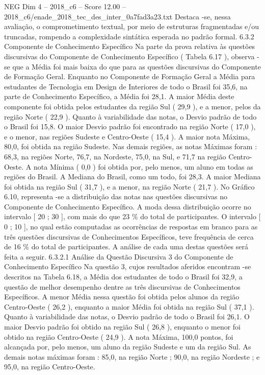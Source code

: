 \begin{textsample}{NEG Dim 4 – 2018\_c6 – Score 12.00 – 2018\_c6/enade\_2018\_tec\_des\_inter\_0a7fad3a23.txt}
Destaca -se, nessa avaliação, o comprometimento textual, por meio de estruturas fragmentadas e/ou truncadas, rompendo a complexidade sintática esperada no padrão formal. 6.3.2 Componente de Conhecimento Específico Na parte da prova relativa às questões discursivas do Componente de Conhecimento Específico ( Tabela 6.17 ), observa -se que a Média foi mais baixa do que para as questões discursivas do Componente de Formação Geral.
Enquanto no Componente de Formação Geral a Média para estudantes de Tecnologia em Design de Interiores de todo o Brasil foi 35,6, na parte de Conhecimento Específico, a Média foi 28,1.
A maior Média deste componente foi obtida pelos estudantes da região Sul ( 29,9 ), e a menor, pelos da região Norte ( 22,9 ).
Quanto à variabilidade das notas, o Desvio padrão de todo o Brasil foi 15,8.
O maior Desvio padrão foi encontrado na região Norte ( 17,0 ), e o menor, nas regiões Sudeste e Centro-Oeste ( 15,4 ).
A maior nota Máxima, 80,0, foi obtida na região Sudeste.
Nas demais regiões, as notas Máximas foram : 68,3, na regiões Norte, 76,7, na Nordeste, 75,0, na Sul, e 71,7 na região Centro-Oeste.
A nota Mínima ( 0,0 ) foi obtida por, pelo menos, um aluno em todas as regiões do Brasil.
A Mediana do Brasil, como um todo, foi 28,3.
A maior Mediana foi obtida na região Sul ( 31,7 ), e a menor, na região Norte ( 21,7 ).
No Gráfico 6.10, representa -se a distribuição das notas nas questões discursivas no Componente de Conhecimento Específico.
A moda dessa distribuição ocorre no intervalo [ 20 ; 30 ], com mais do que 23 \% do total de participantes.
O intervalo [ 0 ; 10 ], no qual estão computadas as ocorrências de respostas em branco para as três questões discursivas de Conhecimentos Específicos, teve frequência de cerca de 16 \% do total de participantes.
A análise de cada uma destas questões será feita a seguir. 6.3.2.1 Análise da Questão Discursiva 3 do Componente de Conhecimento Específico Na questão 3, cujos resultados aferidos encontram -se descritos na Tabela 6.18, a Média dos estudantes de todo o Brasil foi 32,9, a questão de melhor desempenho dentre as três discursivas de Conhecimentos Específicos.
A menor Média nessa questão foi obtida pelos alunos da região Centro-Oeste ( 26,2 ), enquanto a maior Média foi obtida na região Sul ( 37,1 ).
Quanto à variabilidade das notas, o Desvio padrão de todo o Brasil foi 26,1.
O maior Desvio padrão foi obtido na região Sul ( 26,8 ), enquanto o menor foi obtido na região Centro-Oeste ( 24,9 ).
A nota Máxima, 100,0 pontos, foi alcançada por, pelo menos, um aluno da região Sudeste e um da região Sul.
As demais notas máximas foram : 85,0, na região Norte ; 90,0, na região Nordeste ; e 95,0, na região Centro-Oeste.

\end{textsample}
